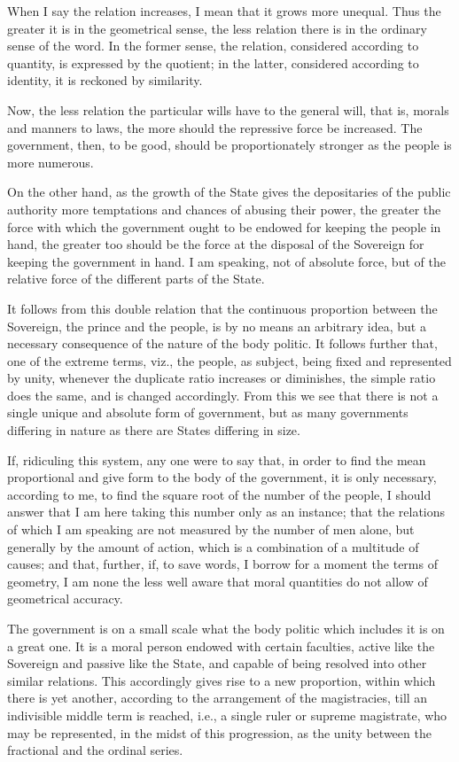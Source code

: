 \documentclass[12pt]{book}
\begin{document}
When I say the relation increases, I mean that it grows more unequal. Thus the greater it is in the geometrical sense, the less relation there is in the ordinary sense of the word. In the former sense, the relation, considered according to quantity, is expressed by the quotient; in the latter, considered according to identity, it is reckoned by similarity.

Now, the less relation the particular wills have to the general will, that is, morals and manners to laws, the more should the repressive force be increased. The government, then, to be good, should be proportionately stronger as the people is more numerous.

On the other hand, as the growth of the State gives the depositaries of the public authority more temptations and chances of abusing their power, the greater the force with which the government ought to be endowed for keeping the people in hand, the greater too should be the force at the disposal of the Sovereign for keeping the government in hand. I am speaking, not of absolute force, but of the relative force of the different parts of the State.

It follows from this double relation that the continuous proportion between the Sovereign, the prince and the people, is by no means an arbitrary idea, but a necessary consequence of the nature of the body politic. It follows further that, one of the extreme terms, viz., the people, as subject, being fixed and represented by unity, whenever the duplicate ratio increases or diminishes, the simple ratio does the same, and is changed accordingly. From this we see that there is not a single unique and absolute form of government, but as many governments differing in nature as there are States differing in size.

If, ridiculing this system, any one were to say that, in order to find the mean proportional and give form to the body of the government, it is only necessary, according to me, to find the square root of the number of the people, I should answer that I am here taking this number only as an instance; that the relations of which I am speaking are not measured by the number of men alone, but generally by the amount of action, which is a combination of a multitude of causes; and that, further, if, to save words, I borrow for a moment the terms of geometry, I am none the less well aware that moral quantities do not allow of geometrical accuracy.

The government is on a small scale what the body politic which includes it is on a great one. It is a moral person endowed with certain faculties, active like the Sovereign and passive like the State, and capable of being resolved into other similar relations. This accordingly gives rise to a new proportion, within which there is yet another, according to the arrangement of the magistracies, till an indivisible middle term is reached, i.e., a single ruler or supreme magistrate, who may be represented, in the midst of this progression, as the unity between the fractional and the ordinal series.
\end{document}

